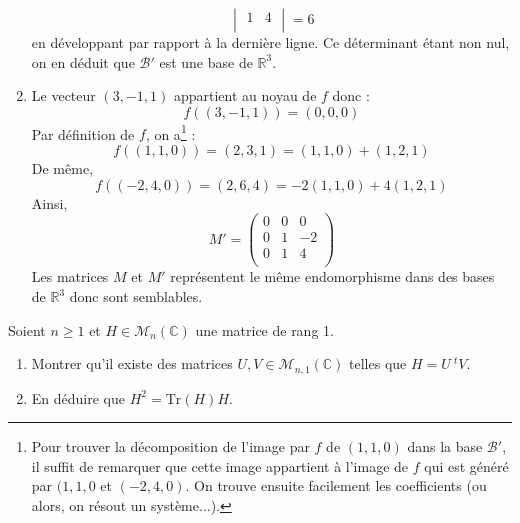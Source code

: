 \documentclass[a4paper,10pt]{report}
\begin{document}
\begin{enumerate}
$$\begin{vmatrix}
 1 & 4\\
\end{vmatrix} = 6 $$
en développant par rapport à la dernière ligne. Ce déterminant étant non nul, on en déduit que $\mathcal{B}'$ est une base de $\mathbb{R}^3$.
\item Le vecteur $(3,-1,1)$ appartient au noyau de $f$ donc :
$$ f((3,-1,1))=(0,0,0)$$
Par définition de $f$, on a\footnote{Pour trouver la décomposition de l'image par $f$ de $(1,1,0)$ dans la base $\mathcal{B}'$, il suffit de remarquer que cette image appartient à l'image de $f$ qui est généré par $(1,1,0$ et $(-2,4,0)$. On trouve ensuite facilement les coefficients (ou alors, on résout un système...).} :
$$ f((1,1,0))=(2,3,1) = (1,1,0) + (1,2,1)$$
De même,
$$ f((-2,4,0))=(2,6,4) = -2(1,1,0) + 4(1,2,1) $$
Ainsi,
$$ M' = \begin{pmatrix}
0 & 0 & 0 \\
0 & 1 & -2 \\
0 & 1 & 4 \\
\end{pmatrix}$$
Les matrices $M$ et $M'$ représentent le même endomorphisme dans des bases de $\mathbb{R}^3$ donc sont semblables.
\end{enumerate}

\begin{Exa} Soient $n \geq 1$ et $H \in \mathcal{M}_n(\mathbb{C})$ une matrice de rang 1.
    \begin{enumerate}
      \item
        Montrer qu'il existe des matrices $U,V \in \mathcal{M}_{n,1}(\mathbb{C})$ telles que $H = U ~^tV$.
      \item En déduire que $H^2 = \textrm{Tr}(H)H$.
 \end{enumerate}
\end{Exa}

\corr 
\end{document}
